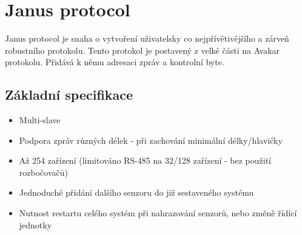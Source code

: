 \chapter{Janus protocol}
Janus protocol je snaha o vytvoření uživatelsky co nejpřívětivějšího a zárveň robustního protokolu.
Tento protokol je postavený z velké části na Avakar protokolu.
Přidává k němu adresaci zpráv a kontrolní byte.

\section{Základní specifikace}
\begin{itemize}
    \item Multi-slave
    \item Podpora zpráv různých délek - při zachování minimální délky/hlavičky
    \item Až 254 zařízení (limitováno RS-485 na 32/128 zařízení - bez použití rozbočovačů)
    \item Jednoduché přidání dalšího senzoru do již sestaveného systému
    \item Nutnost restartu celého systém při nahrazování senzorů, nebo změně řídící jednotky
\end{itemize}